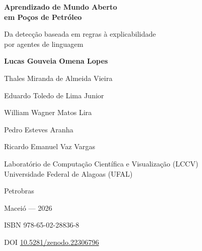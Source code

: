 \documentclass[11pt,a4paper,twoside,openright]{book}
\begin{document}
\frontmatter

\begin{titlepage}
\centering
\vspace*{3cm}
{\Huge\bfseries Aprendizado de Mundo Aberto\\[0.4em] em Poços de Petróleo\par}
\vspace{1.2cm}
{\Large Da detecção baseada em regras à explicabilidade\\ por agentes de linguagem\par}
\vspace{3cm}
{\Large\bfseries Lucas Gouveia Omena Lopes\par}
\vspace{0.6cm}
{\large Thales Miranda de Almeida Vieira\par}
{\large Eduardo Toledo de Lima Junior\par}
{\large William Wagner Matos Lira\par}
\vspace{0.6cm}
{\large Pedro Esteves Aranha\par}
{\large Ricardo Emanuel Vaz Vargas\par}
\vfill
{\large Laboratório de Computação Científica e Visualização (LCCV)\\
Universidade Federal de Alagoas (UFAL)\par}
\vspace{0.4cm}
{\large Petrobras\par}
\vspace{0.8cm}
{\large Maceió --- 2026\par}
\vspace{0.5cm}
{\normalsize ISBN 978-65-02-28836-8\par}
{\normalsize DOI \href{https://doi.org/10.5281/zenodo.22306796}{10.5281/zenodo.22306796}\par}
\end{titlepage}

\cleardoublepage


\cleardoublepage

\cleardoublepage


\cleardoublepage
\tableofcontents
\cleardoublepage
\listoffigures
\cleardoublepage
\listoftables
\end{document}
